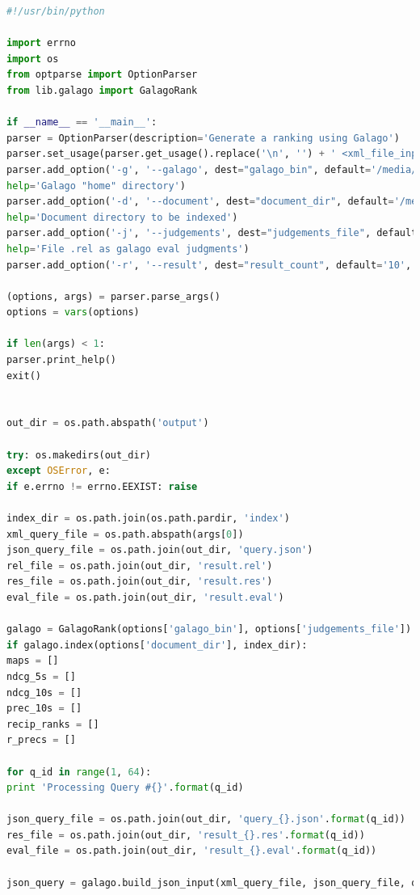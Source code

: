 \documentclass[letterpaper,11pt]{article}
\begin{document}
\begin{lstlisting}[language=python, caption={Script for calculating R-precision}, label={lst:87}]
#!/usr/bin/python

import errno
import os
from optparse import OptionParser
from lib.galago import GalagoRank

if __name__ == '__main__':
parser = OptionParser(description='Generate a ranking using Galago')
parser.set_usage(parser.get_usage().replace('\n', '') + ' <xml_file_input>')
parser.add_option('-g', '--galago', dest="galago_bin", default='/media/erikaris/DATA/ODU/Semester_3/intro_to_info_retrieval/galago/galago-3.10-bin/bin/galago',
help='Galago "home" directory')
parser.add_option('-d', '--document', dest="document_dir", default='/media/erikaris/DATA/ODU/Semester_3/intro_to_info_retrieval/assignments/a4/code-report/cacm',
help='Document directory to be indexed')
parser.add_option('-j', '--judgements', dest="judgements_file", default='/media/erikaris/DATA/ODU/Semester_3/intro_to_info_retrieval/assignments/a4/code-report/cacm.rel',
help='File .rel as galago eval judgments')
parser.add_option('-r', '--result', dest="result_count", default='10', help='Number of result')

(options, args) = parser.parse_args()
options = vars(options)

if len(args) < 1:
parser.print_help()
exit()


out_dir = os.path.abspath('output')

try: os.makedirs(out_dir)
except OSError, e:
if e.errno != errno.EEXIST: raise

index_dir = os.path.join(os.path.pardir, 'index')
xml_query_file = os.path.abspath(args[0])
json_query_file = os.path.join(out_dir, 'query.json')
rel_file = os.path.join(out_dir, 'result.rel')
res_file = os.path.join(out_dir, 'result.res')
eval_file = os.path.join(out_dir, 'result.eval')

galago = GalagoRank(options['galago_bin'], options['judgements_file'])
if galago.index(options['document_dir'], index_dir):
maps = []
ndcg_5s = []
ndcg_10s = []
prec_10s = []
recip_ranks = []
r_precs = []

for q_id in range(1, 64):
print 'Processing Query #{}'.format(q_id)

json_query_file = os.path.join(out_dir, 'query_{}.json'.format(q_id))
res_file = os.path.join(out_dir, 'result_{}.res'.format(q_id))
eval_file = os.path.join(out_dir, 'result_{}.eval'.format(q_id))

json_query = galago.build_json_input(xml_query_file, json_query_file, q_id)


\end{lstlisting}
\end{document}
